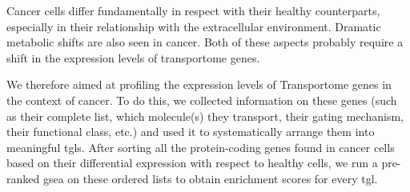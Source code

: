 Cancer cells differ fundamentally in respect with their healthy counterparts, especially in their relationship with the extracellular environment.
Dramatic metabolic shifts are also seen in cancer.
Both of these aspects probably require a shift in the expression levels of transportome genes.

We therefore aimed at profiling the expression levels of Transportome genes in the context of cancer.
To do this, we collected information on these genes (such as their complete list, which molecule(s) they transport, their gating mechanism, their functional class, etc.) and used it to systematically arrange them into meaningful \glspl{tgl}.
After sorting all the protein-coding genes found in cancer cells based on their differential expression with respect to healthy cells, we run a pre-ranked \gls{gsea} on these ordered lists to obtain enrichment scores for every \gls{tgl}.

